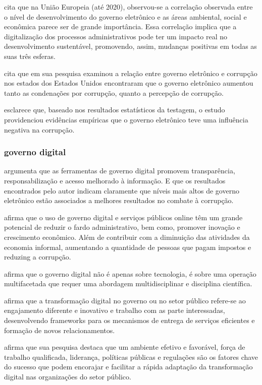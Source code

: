 \cite{ziolo2022government} cita que na União Europeia (até 2020), observou-se a correlação observada entre o nível de desenvolvimento do governo eletrônico e as áreas ambiental, social e econômica parece ser de grande importância. Essa correlação implica que a digitalização dos processos administrativos pode ter um impacto real no desenvolvimento sustentável, promovendo, assim, mudanças positivas em todas as suas três esferas.

\cite{yamarik2023does} cita que em sua pesquisa examinou a relação entre governo eletrônico e corrupção nos estados dos Estados Unidos encontraram que o governo eletrônico aumentou tanto as condenações por corrupção, quanto a percepção de corrupção.

\cite{sugiarti2024effect} esclarece que, baseado nos resultados estatísticos da testagem, o estudo providenciou evidências empíricas que o governo eletrônico teve uma influência negativa na corrupção.

\subsubsection{governo digital}

\cite{martins2018war} argumenta que as ferramentas de governo digital promovem transparência, responsabilização e acesso melhorado à informação. E que os resultados encontrados pelo autor indicam claramente que níveis mais altos de governo eletrônico estão associados a melhores resultados no combate à corrupção.

\cite{veiga2016digital} afirma que o uso de governo digital e serviços públicos online têm um grande potencial de reduzir o fardo administrativo, bem como, promover inovação e crescimento econômico. Além de contribuir com a diminuição das atividades da economia informal, aumentando a quantidade de pessoas que pagam impostos e reduzing a corrupção.

\cite{veiga2016digital} afirma que o governo digital não é apenas sobre tecnologia, é sobre uma operação multifacetada  que requer uma abordagem multidisciplinar e disciplina científica.

\cite{alenezi2022understanding} afirma que a transformação digital no governo ou no setor público refere-se ao engajamento diferente e inovativo e trabalho com as parte interessadas, desenvolvendo frameworks para os mecanismos de entrega de serviços eficientes e formação de novos relacionamentos.

\cite{alenezi2022understanding} afirma que sua pesquisa destaca que um ambiente efetivo e favorável, força de trabalho qualificada, liderança, políticas públicas e regulações são os fatores chave do sucesso que podem encorajar e facilitar a rápida adaptação da transformação digital nas organizações do setor público.

